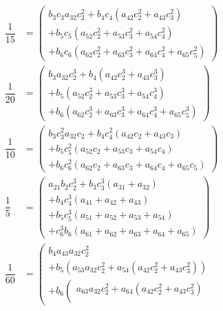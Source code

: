 \documentclass[a4paper,oneside]{book}
\numberwithin{equation}{chapter}
\begin{document}
\begin{align}
\dfrac{1}{{15}} &= \left( \begin{array}{l}
{b_3}{c_3}{a_{32}}c_2^2 + {b_4}{c_4}\left( {{a_{42}}c_2^2 + {a_{43}}c_3^2} \right)\\
 + {b_5}{c_5}\left( {{a_{52}}c_2^2 + {a_{53}}c_3^2 + {a_{54}}c_4^2} \right)\\
 + {b_6}{c_6}\left( {{a_{62}}c_2^2 + {a_{63}}c_3^2 + {a_{64}}c_4^2 + {a_{65}}c_5^2} \right)
\end{array} \right)\\
\dfrac{1}{{20}} &= \left( \begin{array}{l}
{b_3}{a_{32}}c_2^3 + {b_4}\left( {{a_{42}}c_2^3 + {a_{43}}c_3^3} \right)\\
 + {b_5}\left( {{a_{52}}c_2^3 + {a_{53}}c_3^3 + {a_{54}}c_4^3} \right)\\
 + {b_6}\left( {{a_{62}}c_2^3 + {a_{63}}c_3^3 + {a_{64}}c_4^3 + {a_{65}}c_5^3} \right)
\end{array} \right)\\
\dfrac{1}{{10}} &= \left( \begin{array}{l}
{b_3}c_3^2{a_{32}}{c_2} + {b_4}c_4^2\left( {{a_{42}}{c_2} + {a_{43}}{c_3}} \right)\\
 + {b_5}c_5^2\left( {{a_{52}}{c_2} + {a_{53}}{c_3} + {a_{54}}{c_4}} \right)\\
 + {b_6}c_6^2\left( {{a_{62}}{c_2} + {a_{63}}{c_3} + {a_{64}}{c_4} + {a_{65}}{c_5}} \right)
\end{array} \right)\\
\dfrac{1}{5} &= \left( \begin{array}{l}
{a_{21}}{b_2}c_2^3 + {b_3}c_3^3\left( {{a_{31}} + {a_{32}}} \right)\\
 + {b_4}c_4^3\left( {{a_{41}} + {a_{42}} + {a_{43}}} \right)\\
 + {b_5}c_5^3\left( {{a_{51}} + {a_{52}} + {a_{53}} + {a_{54}}} \right)\\
 + c_6^3{b_6}\left( {{a_{61}} + {a_{62}} + {a_{63}} + {a_{64}} + {a_{65}}} \right)
\end{array} \right)\\
\dfrac{1}{{60}} &= \left( \begin{array}{l}
{b_4}{a_{43}}{a_{32}}c_2^2\\
 + {b_5}\left( {{a_{53}}{a_{32}}c_2^2 + {a_{54}}\left( {{a_{42}}c_2^2 + {a_{43}}c_3^2} \right)} \right)\\
 + {b_6}\left( \begin{array}{l}
{a_{63}}{a_{32}}c_2^2 + {a_{64}}\left( {{a_{42}}c_2^2 + {a_{43}}c_3^2} \right)\\

\end{array}
\end{array}
\end{align}
\end{document}
